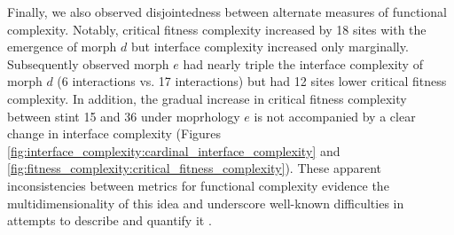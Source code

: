 Finally, we also observed disjointedness between alternate measures of functional complexity.
Notably, critical fitness complexity increased by 18 sites with the emergence of morph $d$ but interface complexity increased only marginally.
Subsequently observed morph $e$ had nearly triple the interface complexity of morph $d$ (6 interactions vs. 17 interactions) but had 12 sites lower critical fitness complexity.
In addition, the gradual increase in critical fitness complexity between stint 15 and 36 under moprhology $e$ is not accompanied by a clear change in interface complexity (Figures \ref{fig:interface_complexity:cardinal_interface_complexity} and \ref{fig:fitness_complexity:critical_fitness_complexity}).
These apparent inconsistencies between metrics for functional complexity evidence the multidimensionality of this idea and underscore well-known difficulties in attempts to describe and quantify it \citep{bottcher2018molecules}.
